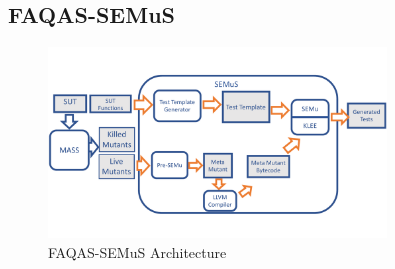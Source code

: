 \newpage
\subsection{FAQAS-SEMuS}
\label{sec:semus}



\begin{figure}[tb]
\begin{center}
\includegraphics[width=0.8\textwidth]{images/semus-architecture}
\caption{FAQAS-SEMuS Architecture}
\label{fig:semus_architecture}
\end{center}
\end{figure}



